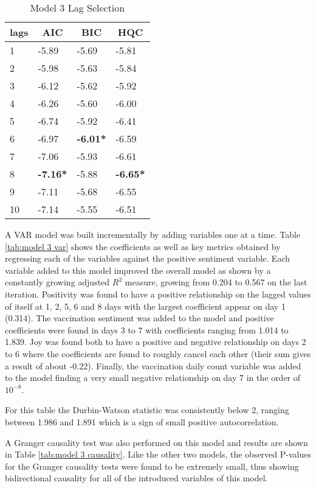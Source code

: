 \begin{table}[H]
\centering
\begin{tabular}{@{}llll@{}}
\toprule
\multicolumn{1}{c}{\textbf{lags}} & \multicolumn{1}{c}{\textbf{AIC}} & \multicolumn{1}{c}{\textbf{BIC}} & \multicolumn{1}{c}{\textbf{HQC}} \\ \midrule
1 & -5.89 & -5.69 & -5.81 \\
2 & -5.98 & -5.63 & -5.84 \\
3 & -6.12 & -5.62 & -5.92 \\
4 & -6.26 & -5.60 & -6.00 \\
5 & -6.74 & -5.92 & -6.41 \\
6 & -6.97 & \textbf{-6.01*} & -6.59 \\
7 & -7.06 & -5.93 & -6.61 \\
8 & \textbf{-7.16*} & -5.88 & \textbf{-6.65*} \\
9 & -7.11 & -5.68 & -6.55 \\
10 & -7.14 & -5.55 & -6.51 \\ \bottomrule
\end{tabular}
\caption{Model 3 Lag Selection}
\label{tab:model 3 lag}
\end{table}
 
A VAR model was built incrementally by adding variables one at a time. Table \ref{tab:model 3 var} shows the coefficients as well as key metrics obtained by regressing each of the variables against the positive sentiment variable. Each variable added to this model improved the overall model as shown by a constantly growing adjusted $R^2$ measure, growing from 0.204 to 0.567 on the last iteration. Positivity was found to have a positive relationship on the lagged values of itself at 1, 2, 5, 6 and 8 days with the largest coefficient appear on day 1 (0.314). The vaccination sentiment was added to the model and positive coefficients were found in days 3 to 7 with coefficients ranging from 1.014 to 1.839. Joy was found both to have a positive and negative relationship on days 2 to 6 where the coefficients are found to roughly cancel each other (their sum gives a result of about -0.22). Finally, the vaccination daily count variable was added to the model finding a very small negative relationship on day 7 in the order of $10^{-8}$.

For this table the Durbin-Watson statistic was consistently below 2, ranging between 1.986 and 1.891 which is a sign of small positive autocorrelation.

A Granger causality test was also performed on this model and results are shown in Table \ref{tab:model 3 causality}. Like the other two models, the observed P-values for the Granger causality tests were found to be extremely small, thus showing bidirectional causality for all of the introduced variables of this model.

